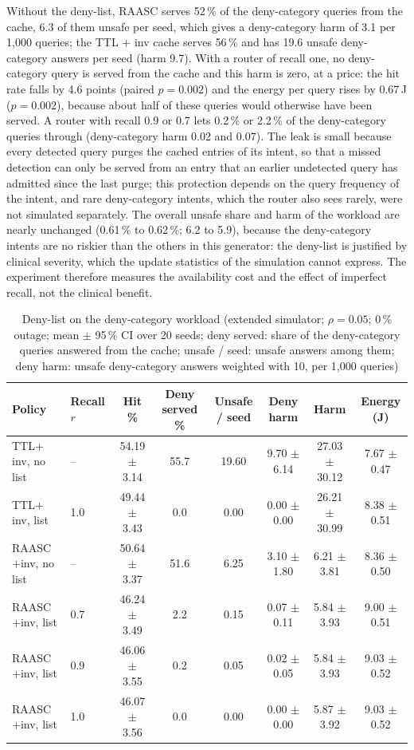 \documentclass[journal]{IEEEtran}
\newcommand{\pct}{\,\%}
\begin{document}
Without the deny-list, RAASC serves 52\pct{} of the deny-category queries from the cache, 6.3 of them unsafe per seed, which gives a deny-category harm of 3.1 per 1,000 queries; the TTL $+$ inv cache serves 56\pct{} and has 19.6 unsafe deny-category answers per seed (harm 9.7). With a router of recall one, no deny-category query is served from the cache and this harm is zero, at a price: the hit rate falls by 4.6 points (paired $p=0.002$) and the energy per query rises by 0.67\,J ($p=0.002$), because about half of these queries would otherwise have been served. A router with recall 0.9 or 0.7 lets 0.2\pct{} or 2.2\pct{} of the deny-category queries through (deny-category harm 0.02 and 0.07). The leak is small because every detected query purges the cached entries of its intent, so that a missed detection can only be served from an entry that an earlier undetected query has admitted since the last purge; this protection depends on the query frequency of the intent, and rare deny-category intents, which the router also sees rarely, were not simulated separately. The overall unsafe share and harm of the workload are nearly unchanged (0.61\pct{} to 0.62\pct{}; 6.2 to 5.9), because the deny-category intents are no riskier than the others in this generator: the deny-list is justified by clinical severity, which the update statistics of the simulation cannot express. The experiment therefore measures the availability cost and the effect of imperfect recall, not the clinical benefit.

\begin{table}[!t]
\caption{Deny-list on the deny-category workload (extended simulator; $\rho=0.05$; 0\pct{} outage; mean $\pm$ 95\pct{} CI over 20 seeds; deny served: share of the deny-category queries answered from the cache; unsafe / seed: unsafe answers among them; deny harm: unsafe deny-category answers weighted with 10, per 1,000 queries)}
\label{tab:deny}
\centering\footnotesize
\begin{tabular}{llcccccc}
\toprule
Policy & Recall $r$ & Hit \% & Deny served \% & Unsafe / seed & Deny harm & Harm & Energy (J)\\
\midrule
TTL$+$inv, no list & -- & 54.19 $\pm$ 3.14 & 55.7 & 19.60 & 9.70 $\pm$ 6.14 & 27.03 $\pm$ 30.12 & 7.67 $\pm$ 0.47\\
TTL$+$inv, list & 1.0 & 49.44 $\pm$ 3.43 & 0.0 & 0.00 & 0.00 $\pm$ 0.00 & 26.21 $\pm$ 30.99 & 8.38 $\pm$ 0.51\\
RAASC$+$inv, no list & -- & 50.64 $\pm$ 3.37 & 51.6 & 6.25 & 3.10 $\pm$ 1.80 & 6.21 $\pm$ 3.81 & 8.36 $\pm$ 0.50\\
RAASC$+$inv, list & 0.7 & 46.24 $\pm$ 3.49 & 2.2 & 0.15 & 0.07 $\pm$ 0.11 & 5.84 $\pm$ 3.93 & 9.00 $\pm$ 0.51\\
RAASC$+$inv, list & 0.9 & 46.06 $\pm$ 3.55 & 0.2 & 0.05 & 0.02 $\pm$ 0.05 & 5.84 $\pm$ 3.93 & 9.03 $\pm$ 0.52\\
RAASC$+$inv, list & 1.0 & 46.07 $\pm$ 3.56 & 0.0 & 0.00 & 0.00 $\pm$ 0.00 & 5.87 $\pm$ 3.92 & 9.03 $\pm$ 0.52\\
\bottomrule
\end{tabular}
\end{table}
\end{document}
